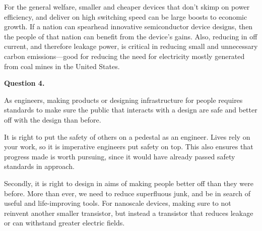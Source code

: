 \documentclass{IEEEtran}
\begin{document}
For the general welfare, smaller and cheaper devices that don't skimp on power efficiency, and deliver on high switching speed can be large boosts to economic growth. If a nation can spearhead innovative semiconductor device designs, then the people of that nation can benefit from the device's gains. Also, reducing in off current, and therefore leakage power, is critical in reducing small and unnecessary carbon emissions---good for reducing the need for electricity mostly generated from coal mines in the United States.

\textbf{Question 4.}

\smallskip

As engineers, making products or designing infrastructure for people requires standards to make sure the public that interacts with a design are safe and better off with the design than before.

It is right to put the safety of others on a pedestal as an engineer. Lives rely on your work, so it is imperative engineers put safety on top. This also ensures that progress made is worth pursuing, since it would have already passed safety standards in approach.

Secondly, it is right to design in aims of making people better off than they were before. More than ever, we need to reduce superfluous junk, and be in search of useful and life-improving tools. For nanoscale devices, making sure to not reinvent another smaller transistor, but instead a transistor that reduces leakage or can withstand greater electric fields.




\end{document}
